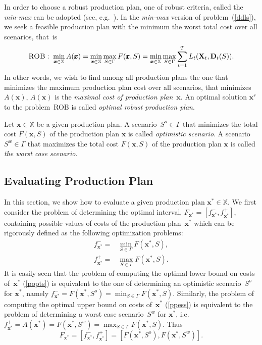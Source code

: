 \documentclass[11pt]{article}
\newcommand{\Xset}{\mathbb{X}}
\begin{document}
In order to choose a robust production plan,
one of robust criteria,
called the \emph{min-max} can be
adopted (see, e.g.~\cite{KY97}).
In the \emph{min-max} version of problem~(\ref{ddls}), we seek a 
feasible production plan with the minimum
the worst total cost
over all scenarios, that~is
\[
\textsc{ROB}:\; \min_{\pmb{x}\in \Xset}A(\pmb{x})=
\min_{\pmb{x}\in \Xset}\max_{S\in\Gamma} F(\pmb{x},S)
=
\min_{\pmb{x}\in \Xset}\max_{S\in\Gamma} \sum_{t=1}^{T}
L_t(\mathbf{X}_t,\mathbf{D}_t(S)).
\]
In other words, we wish to find among all production plans the one that
minimizes the maximum production plan cost over all scenarios, 
that minimizes~$A(\pmb{x})$, $A(\pmb{x})$ is the \emph{maximal cost of production
plan}~$\pmb{x}$. 
An optimal solution $\pmb{x}^r$ to the problem~\textsc{ROB}
is called  \emph{optimal robust production plan}.
 
Let $\pmb{x}\in \Xset$ be a given production plan.
A scenario~$S^{o}\in \Gamma$ that minimizes  the total cost $F(\pmb{x},S)$ of 
the production plan $\pmb{x}$
is
called \emph{optimistic scenario}.
A scenario~$S^{w}\in \Gamma$ that maximizes the total cost 
 $F(\pmb{x},S)$ of the production plan
 $\pmb{x}$ is
called \emph{the
worst case scenario}.



\subsection{Evaluating  Production Plan}
\label{sepp}

In this section, we 
show how to evaluate a given production plan
$\pmb{x}^{*}\in \Xset$. 
We first consider the problem of determining 
the optimal interval, 
$F_{\pmb{x}^{*}}=[f_{\pmb{x}^{*}}^{-},f_{\pmb{x}^{*}}^{+}]$,
containing possible values of costs of the production plan~$\pmb{x}^{*}$
which can be rigorously defined as the following optimization problems:
\begin{align}
f_{\pmb{x}^{*}}^{-}=&\min_{S\in \Gamma}F(\pmb{x}^{*},S),\label{popts}\\
f_{\pmb{x}^{*}}^{+}=&\max_{S\in \Gamma}F(\pmb{x}^{*},S).\label{ppess}
\end{align}
It is easily seen that the problem of computing the optimal lower bound on costs 
of~$\pmb{x}^{*}$ (\ref{popts}) is equivalent to 
the one of determining   an optimistic 
scenario~$S^{o}$ for $\pmb{x}^{*}$, namely 
$f_{\pmb{x}^{*}}^{-}=F(\pmb{x}^{*},S^{o})= \min_{S\in \Gamma}F(\pmb{x}^{*},S)$.
Similarly, 
 the problem of computing the optimal upper bound on costs 
of~$\pmb{x}^{*}$ (\ref{ppess}) is equivalent to 
the problem of determining   a worst case
scenario~$S^{w}$ for $\pmb{x}^{*}$, i.e.
$f_{\pmb{x}^{*}}^{+}=
A(\pmb{x}^{*})=F(\pmb{x}^{*},S^{w})= \max_{S\in \Gamma}F(\pmb{x}^{*},S)$. Thus
\begin{equation}
F_{\pmb{x}^{*}}=[f_{\pmb{x}^{*}}^{-},f_{\pmb{x}^{*}}^{+}]=[F(\pmb{x}^{*},S^{o}), F(\pmb{x}^{*},S^{w})].
\label{icost}
\end{equation}
\end{document}
